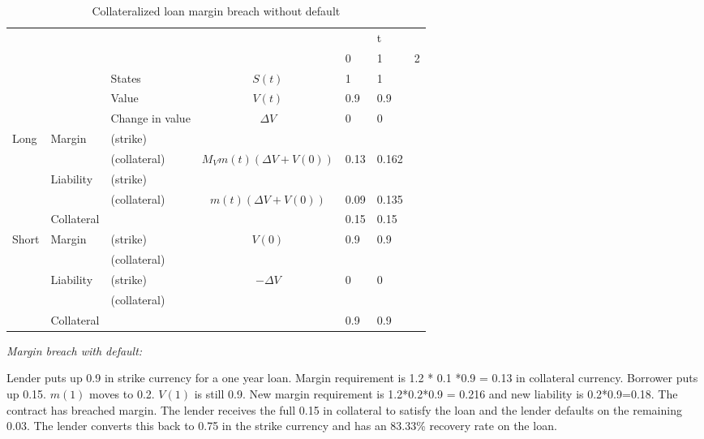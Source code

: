 \documentclass[12pt]{article}
\begin{document}
\begin{table}
\begin{tabular}{lll|c|lll}
&  &  &  &   & t &\\  
&  &  &  & 0 & 1 & 2\\
\hline
\hline
&  & States &  $S(t)$ & 1 & 1 & \\
&  & Value  &  $V(t)$  & 0.9 & 0.9 &  \\
&  & Change in value & $\Delta V$ & 0& 0 &  \\
\hline
Long      & Margin    & (strike)     &  &  &  &  \\
          &           & (collateral) & $M_V m(t)(\Delta V + V(0))$ & 0.13 & 0.162 &\\ 
          & Liability & (strike)     &  &  &  & \\ 
          &           & (collateral)& $m(t)(\Delta V + V(0))$& 0.09  & 0.135 &\\
          & Collateral&                       &    & 0.15 & 0.15 & \\ 
\hline          
Short     & Margin    & (strike)     & $V(0)$ & 0.9 & 0.9 & \\
          &           & (collateral) & & & &\\
          & Liability & (strike)     & $-\Delta V$ & 0 & 0 & \\
          &           & (collateral) & & & &\\
          & Collateral&                       &    & 0.9 & 0.9 & \\ 
\hline          

\end{tabular}
\caption{Collateralized loan margin breach without default}
\label{fut}
\end{table}

\textit{Margin breach with default:}

Lender puts up 0.9 in strike currency for a one year loan. Margin requirement is 1.2 * 0.1 *0.9 = 0.13 in collateral currency. Borrower puts up 0.15.
$m(1)$ moves to 0.2. $V(1)$ is still 0.9. New margin requirement is 1.2*0.2*0.9 = 0.216 and new liability is 0.2*0.9=0.18.  The contract has breached margin. The lender receives the full 0.15 in collateral to satisfy the loan and the lender defaults on the remaining 0.03. The lender converts this back to 0.75 in the strike currency and has an 83.33\% recovery rate on the loan. 
\end{document}
